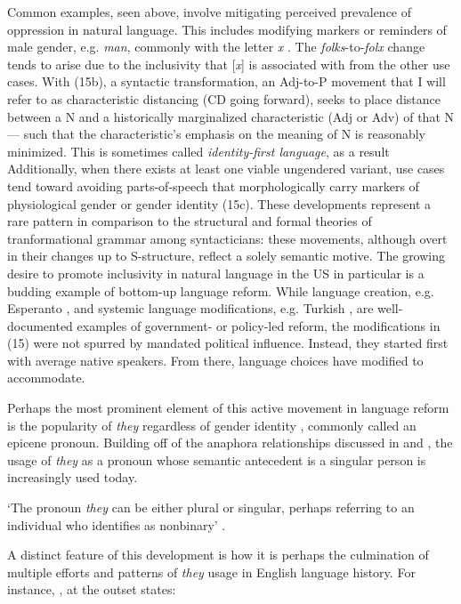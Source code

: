 \documentclass{article}
\begin{document}
Common examples, seen above, involve mitigating perceived prevalence of oppression in natural language. This includes modifying markers or reminders of male gender, e.g. \textit{man}, commonly with the letter \textit{x} \citep{Ashlee17}. The \textit{folks}-to-\textit{folx} change tends to arise due to the inclusivity that [\textit{x}] is associated with from the other use cases. With (15b), a syntactic transformation, an Adj-to-P movement that I will refer to as characteristic distancing (CD going forward), seeks to place distance between a N and a historically marginalized characteristic (Adj or Adv) of that N --- such that the characteristic's emphasis on the meaning of N is reasonably minimized. This is sometimes called \textit{identity-first language}, as a result \citep{Dunn15} Additionally, when there exists at least one viable ungendered variant, use cases tend toward avoiding parts-of-speech that morphologically carry markers of physiological gender or gender identity (15c). These developments represent a rare pattern in comparison to the structural and formal theories of tranformational grammar among syntacticians: these movements, although overt in their changes up to S-structure, reflect a solely semantic motive. The growing desire to promote inclusivity in natural language in the US in particular is a budding example of bottom-up language reform. While language creation, e.g. Esperanto \citep{Fiedler}, and systemic language modifications, e.g. Turkish \citep{Tachau}, are well-documented examples of government- or policy-led reform, the modifications in (15) were not spurred by mandated political influence. Instead, they started first with average native speakers. From there, language choices have modified to accommodate.

Perhaps the most prominent element of this active movement in language reform is the popularity of \textit{they} regardless of gender identity \citep{Zimman}, commonly called an epicene pronoun. Building off of the anaphora relationships discussed in \citet{Arnold21} and \citet{Balhorn}, the usage of \textit{they} as a pronoun whose semantic antecedent is a singular person is increasingly used today. 

\ea
    `The pronoun \textit{they} can be either plural or singular, perhaps referring to an individual who identifies as nonbinary' \citep[p.~1]{Arnold21}.
\z

A distinct feature of this development is how it is perhaps the culmination of multiple efforts and patterns of \textit{they} usage in English language history. For instance, \citet{Baron}, at the outset states:
\end{document}
